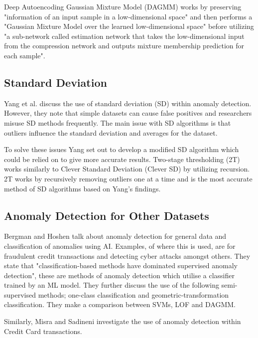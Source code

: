 \documentclass[journal]{IEEEtran}
\begin{document}
Deep Autoencoding Gaussian Mixture Model (DAGMM) works by preserving "information of an input sample in a low-dimensional space" and then performs a "Gaussian Mixture Model over the learned low-dimensional space" before utilizing "a sub-network called estimation network that takes the low-dimensional input from the compression network and outputs mixture membership prediction for each sample"\cite{Zong2018}.

\subsection{Standard Deviation}
\noindent Yang et al. discuss the use of standard deviation (SD) within anomaly detection\cite{Yang2019}. However, they note that simple datasets can cause false positives\cite{Pollet2017} and researchers misuse SD methods frequently\cite{Simmons2016}. The main issue with SD algorithms is that outliers influence the standard deviation and averages for the dataset.

To solve these issues Yang set out to develop a modified SD algorithm which could be relied on to give more accurate results. Two-stage thresholding (2T)\cite{Yang2019} works similarly to Clever Standard Deviation (Clever SD)\cite{Buzzi2011} by utilizing recursion. 2T works by recursively removing outliers one at a time and is the most accurate method of SD algorithms based on Yang's findings.

\subsection{Anomaly Detection for Other Datasets}
\noindent Bergman and Hoshen talk about anomaly detection for general data and classification of anomalies using AI. Examples, of where this is used, are for fraudulent credit transactions and detecting cyber attacks amongst others\cite{Bergman2020}. They state that "classification-based methods have dominated supervised anomaly detection", these are methods of anomaly detection which utilise a classifier trained by an ML model. They further discuss the use of the following semi-supervised methods; one-class classification and geometric-transformation classification. They make a comparison between SVMs\cite{Schoelkopf1999}, LOF\cite{Breunig2000} and DAGMM\cite{Zong2018}.

Similarly, Misra and Sadineni investigate the use of anomaly detection within Credit Card transactions\cite{Misra2020}\cite{Sadineni2020}.
\end{document}
